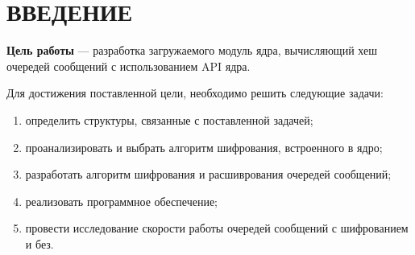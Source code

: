 \section*{\large ВВЕДЕНИЕ}



\textbf{Цель работы} --- разработка загружаемого модуль ядра, вычисляющий хеш очередей сообщений с использованием API ядра.


Для достижения поставленной цели, необходимо решить следующие задачи:
\begin{enumerate}
    \item определить структуры, связанные с поставленной задачей;
    \item проанализировать и выбрать алгоритм шифрования, встроенного в ядро;
    \item разработать алгоритм шифрования и расшиврования очередей сообщений;
    \item реализовать программное обеспечение;
    \item провести исследование скорости работы очередей сообщений с шифрованием и без.
\end{enumerate}